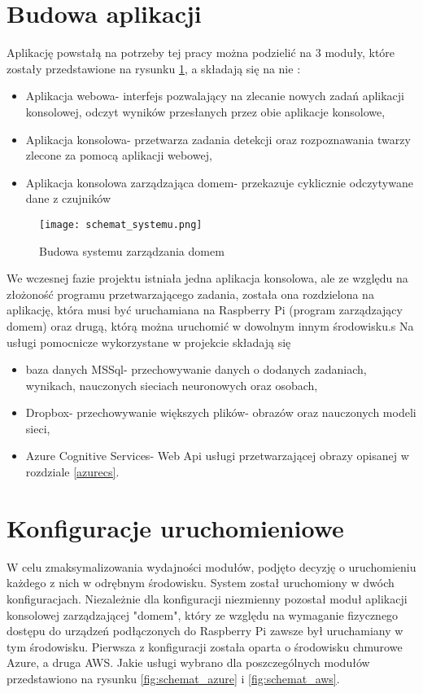\section{Budowa aplikacji}
Aplikację powstałą na potrzeby tej pracy można podzielić na 3 moduły, które zostały przedstawione na rysunku \ref{fig:schemat_systemu}, a składają się na nie :
\begin{itemize}
\item Aplikacja webowa- interfejs pozwalający na zlecanie nowych zadań aplikacji konsolowej, odczyt wyników przesłanych przez obie aplikacje konsolowe,
\item Aplikacja konsolowa- przetwarza zadania detekcji oraz rozpoznawania twarzy zlecone za pomocą aplikacji webowej,
\item Aplikacja konsolowa zarządzająca domem- przekazuje cyklicznie odczytywane dane z czujników %
\end{itemize}
\begin{figure}[H]
	\centering
	\texttt{[image: schemat\_systemu.png]}
	\caption{Budowa systemu zarządzania domem}
	\label{fig:schemat_systemu}
\end{figure}
We wczesnej fazie projektu istniała jedna aplikacja konsolowa, ale ze względu na złożoność programu przetwarzającego zadania, została ona rozdzielona na aplikację, która musi być uruchamiana na Raspberry Pi (program zarządzający domem) oraz drugą, którą można uruchomić w dowolnym innym środowisku.s
Na usługi pomocnicze wykorzystane w projekcie składają się
\begin{itemize}
\item baza danych MSSql- przechowywanie danych o dodanych zadaniach, wynikach, nauczonych sieciach neuronowych oraz osobach,
\item Dropbox- przechowywanie większych plików- obrazów oraz nauczonych modeli sieci,
\item Azure Cognitive Services- Web Api usługi przetwarzającej obrazy opisanej w rozdziale \ref{azurecs}.
\end{itemize}

\section{Konfiguracje uruchomieniowe}
W celu zmaksymalizowania wydajności modułów, podjęto decyzję o uruchomieniu każdego z nich w odrębnym środowisku. System został uruchomiony w dwóch konfiguracjach. Niezależnie dla konfiguracji niezmienny pozostał moduł aplikacji konsolowej zarządzającej "domem", który ze względu na wymaganie fizycznego dostępu do urządzeń podłączonych do Raspberry Pi zawsze był uruchamiany w tym środowisku.
Pierwsza z konfiguracji została oparta o środowisku chmurowe Azure, a druga AWS. Jakie usługi wybrano dla poszczególnych modułów przedstawiono na rysunku \ref{fig:schemat_azure} i \ref{fig:schemat_aws}.

